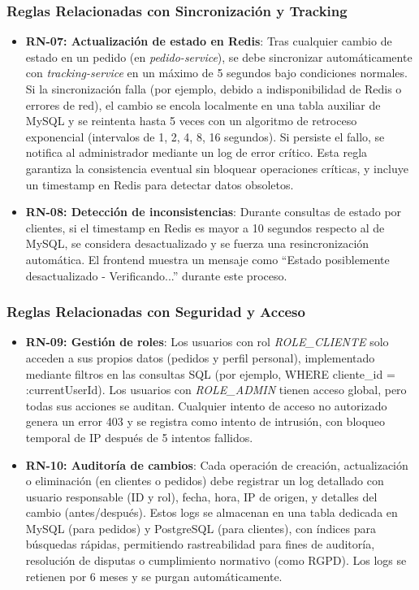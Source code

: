 \documentclass[a4paper,12pt]{article}
\begin{document}
\subsubsection{Reglas Relacionadas con Sincronización y Tracking}
\begin{itemize}
    \item \textbf{RN-07: Actualización de estado en Redis}: Tras cualquier cambio de estado en un pedido (en \textit{pedido-service}), se debe sincronizar automáticamente con \textit{tracking-service} en un máximo de 5 segundos bajo condiciones normales. Si la sincronización falla (por ejemplo, debido a indisponibilidad de Redis o errores de red), el cambio se encola localmente en una tabla auxiliar de MySQL y se reintenta hasta 5 veces con un algoritmo de retroceso exponencial (intervalos de 1, 2, 4, 8, 16 segundos). Si persiste el fallo, se notifica al administrador mediante un log de error crítico. Esta regla garantiza la consistencia eventual sin bloquear operaciones críticas, y incluye un timestamp en Redis para detectar datos obsoletos.
    
    \item \textbf{RN-08: Detección de inconsistencias}: Durante consultas de estado por clientes, si el timestamp en Redis es mayor a 10 segundos respecto al de MySQL, se considera desactualizado y se fuerza una resincronización automática. El frontend muestra un mensaje como ``Estado posiblemente desactualizado - Verificando...'' durante este proceso.
\end{itemize}

\subsubsection{Reglas Relacionadas con Seguridad y Acceso}
\begin{itemize}
    \item \textbf{RN-09: Gestión de roles}: Los usuarios con rol \textit{ROLE\_CLIENTE} solo acceden a sus propios datos (pedidos y perfil personal), implementado mediante filtros en las consultas SQL (por ejemplo, WHERE cliente\_id = :currentUserId). Los usuarios con \textit{ROLE\_ADMIN} tienen acceso global, pero todas sus acciones se auditan. Cualquier intento de acceso no autorizado genera un error 403 y se registra como intento de intrusión, con bloqueo temporal de IP después de 5 intentos fallidos.
    
    \item \textbf{RN-10: Auditoría de cambios}: Cada operación de creación, actualización o eliminación (en clientes o pedidos) debe registrar un log detallado con usuario responsable (ID y rol), fecha, hora, IP de origen, y detalles del cambio (antes/después). Estos logs se almacenan en una tabla dedicada en MySQL (para pedidos) y PostgreSQL (para clientes), con índices para búsquedas rápidas, permitiendo rastreabilidad para fines de auditoría, resolución de disputas o cumplimiento normativo (como RGPD). Los logs se retienen por 6 meses y se purgan automáticamente.
\end{itemize}
\end{document}
